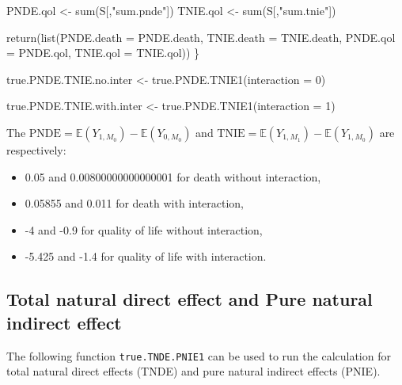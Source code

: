 \documentclass[
]{book}
\newenvironment{Shaded}{\begin{snugshade}}{\end{snugshade}}
\newcommand{\AttributeTok}[1]{\textcolor[rgb]{0.77,0.63,0.00}{#1}}
\newcommand{\DecValTok}[1]{\textcolor[rgb]{0.00,0.00,0.81}{#1}}
\newcommand{\FunctionTok}[1]{\textcolor[rgb]{0.00,0.00,0.00}{#1}}
\newcommand{\NormalTok}[1]{#1}
\newcommand{\OtherTok}[1]{\textcolor[rgb]{0.56,0.35,0.01}{#1}}
\newcommand{\StringTok}[1]{\textcolor[rgb]{0.31,0.60,0.02}{#1}}
\providecommand{\tightlist}{%
  \setlength{\itemsep}{0pt}\setlength{\parskip}{0pt}}
\begin{document}
\begin{Shaded}
\begin{Highlighting}[]
\NormalTok{  PNDE.qol }\OtherTok{\textless{}{-}} \FunctionTok{sum}\NormalTok{(S[,}\StringTok{"sum.pnde"}\NormalTok{])}
\NormalTok{  TNIE.qol }\OtherTok{\textless{}{-}} \FunctionTok{sum}\NormalTok{(S[,}\StringTok{"sum.tnie"}\NormalTok{])}
  
  \FunctionTok{return}\NormalTok{(}\FunctionTok{list}\NormalTok{(}\AttributeTok{PNDE.death =}\NormalTok{ PNDE.death, }\AttributeTok{TNIE.death =}\NormalTok{ TNIE.death, }
              \AttributeTok{PNDE.qol =}\NormalTok{ PNDE.qol, }\AttributeTok{TNIE.qol =}\NormalTok{ TNIE.qol))}
\NormalTok{\}}
\end{Highlighting}
\end{Shaded}

\begin{Shaded}
\begin{Highlighting}[]
\NormalTok{true.PNDE.TNIE.no.inter }\OtherTok{\textless{}{-}} \FunctionTok{true.PNDE.TNIE1}\NormalTok{(}\AttributeTok{interaction =} \DecValTok{0}\NormalTok{)}

\NormalTok{true.PNDE.TNIE.with.inter }\OtherTok{\textless{}{-}} \FunctionTok{true.PNDE.TNIE1}\NormalTok{(}\AttributeTok{interaction =} \DecValTok{1}\NormalTok{)}
\end{Highlighting}
\end{Shaded}

The \(\text{PNDE}=\mathbb{E}\left( Y_{1,M_0}\right) - \mathbb{E}\left(Y_{0,M_0}\right)\) and \(\text{TNIE}=\mathbb{E}\left( Y_{1,M_1}\right) - \mathbb{E}\left(Y_{1,M_0}\right)\) are respectively:

\begin{itemize}
\tightlist
\item
  0.05 and 0.00800000000000001 for death without interaction,
\item
  0.05855 and 0.011 for death with interaction,
\item
  -4 and -0.9 for quality of life without interaction,
\item
  -5.425 and -1.4 for quality of life with interaction.
\end{itemize}

\hypertarget{total-natural-direct-effect-and-pure-natural-indirect-effect}{%
\subsection{Total natural direct effect and Pure natural indirect effect}\label{total-natural-direct-effect-and-pure-natural-indirect-effect}}

The following function \texttt{true.TNDE.PNIE1} can be used to run the calculation for total natural direct effects (TNDE) and pure natural indirect effects (PNIE).
\end{document}
